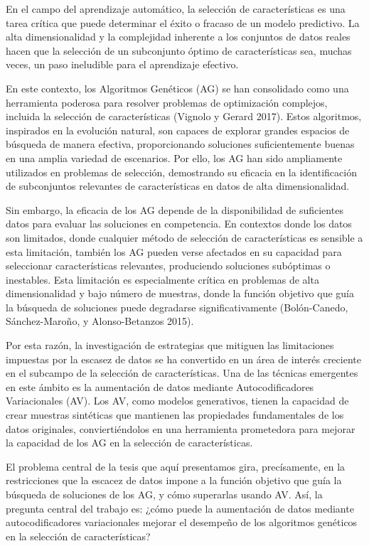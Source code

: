 
En el campo del aprendizaje automático, la selección de características es una tarea crítica que puede determinar el éxito o fracaso de un modelo predictivo. La alta dimensionalidad y la complejidad inherente a los conjuntos de datos reales hacen que la selección de un subconjunto óptimo de características sea, muchas veces, un paso ineludible para el aprendizaje efectivo.

En este contexto, los Algoritmos Genéticos (AG) se han consolidado como una herramienta poderosa para resolver problemas de optimización complejos, incluida la selección de características (Vignolo y Gerard 2017). Estos algoritmos, inspirados en la evolución natural, son capaces de explorar grandes espacios de búsqueda de manera efectiva, proporcionando soluciones suficientemente buenas en una amplia variedad de escenarios. Por ello, los AG han sido ampliamente utilizados en problemas de selección, demostrando su eficacia en la identificación de subconjuntos relevantes de características en datos de alta dimensionalidad.

Sin embargo, la eficacia de los AG depende de la disponibilidad de suficientes datos para evaluar las soluciones en competencia. En contextos donde los datos son limitados, donde cualquier método de selección de características es sensible a esta limitación, también los AG pueden verse afectados en su capacidad para seleccionar características relevantes, produciendo soluciones subóptimas o inestables. Esta limitación es especialmente crítica en problemas de alta dimensionalidad y bajo número de muestras, donde la función objetivo que guía la búsqueda de soluciones puede degradarse significativamente (Bolón-Canedo, Sánchez-Maroño, y Alonso-Betanzos 2015).

Por esta razón, la investigación de estrategias que mitiguen las limitaciones impuestas por la escasez de datos se ha convertido en un área de interés creciente en el subcampo de la selección de características. Una de las técnicas emergentes en este ámbito es la aumentación de datos mediante Autocodificadores Variacionales (AV). Los AV, como modelos generativos, tienen la capacidad de crear muestras sintéticas que mantienen las propiedades fundamentales de los datos originales, conviertiéndolos en una herramienta prometedora para mejorar la capacidad de los AG en la selección de características.

El problema central de la tesis que aquí presentamos gira, precísamente, en la restricciones que la escacez de datos impone a la función objetivo que guía la búsqueda de soluciones de los AG, y cómo superarlas usando AV. Así, la pregunta central del trabajo es: ¿cómo puede la aumentación de datos mediante autocodificadores variacionales mejorar el desempeño de los algoritmos genéticos en la selección de características?

